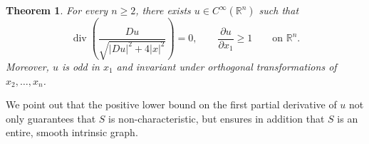 \documentclass[11pt]{amsart}
\renewcommand{\geq}{\geqslant}
\renewcommand{\le}{<}
\renewcommand{\ge}{>}
\newcommand{\rr}{{\mathbb{R}}}
\newcommand{\hh}{{\mathbb{H}}}
\DeclareMathOperator{\divv}{div}
\newtheorem{theorem}{Theorem}[section]
\theoremstyle{definition}
\newtheorem*{subriembp}{Sub-Riemannian stable Bernstein problem}
\theoremstyle{remark}
\numberwithin{equation}{section}
\begin{document}

%
%
\begin{theorem}\label{thm_main_1}
For every $n\geq 2$, there exists $u\in C^\infty(\rr^n)$ such that
\begin{equation}\label{eq:target}
 \divv\left(\frac{Du}{\sqrt{|Du|^2+4|x|^2}}\right)=0,
 \qquad \frac{\partial u}{\partial x_1}\geq 1\qquad\text{on }\rr^n.
\end{equation}
Moreover, $u$ is odd in $x_1$ and invariant under orthogonal transformations of $x_2,\ldots,x_n$.
\end{theorem}
We point out that the positive lower bound on the first partial derivative of $u$ not only guarantees that $S$ is non-characteristic, but ensures in addition that $S$ is an entire, smooth intrinsic graph. 
\end{document}
